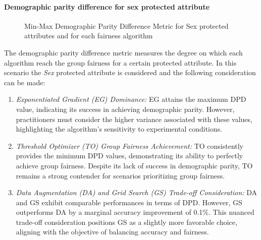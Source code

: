 \paragraph{Demographic parity difference for sex protected attribute}

\begin{figure}[H]
    \centering
    \caption{Min-Max Demographic Parity Difference Metric for Sex protected attributes and for each fairness algorithm}
\end{figure}

The demographic parity difference metric measures the degree on which each algorithm reach the group fairness for a certain protected attribute. In this scenario the \emph{Sex} protected attribute is considered and the following consideration can be made:

\begin{enumerate}
    \item \emph{Exponentiated Gradient (EG) Dominance:} EG attains the maximum DPD value, indicating its success in achieving demographic parity. However, practitioners must consider the higher variance associated with these values, highlighting the algorithm's sensitivity to experimental conditions.

    \item \emph{Threshold Optimizer (TO) Group Fairness Achievement:} TO consistently provides the minimum DPD values, demonstrating its ability to perfectly achieve group fairness. Despite its lack of success in demographic parity, TO remains a strong contender for scenarios prioritizing group fairness.

    \item \emph{Data Augmentation (DA) and Grid Search (GS) Trade-off Consideration:} DA and GS exhibit comparable performances in terms of DPD. However, GS outperforms DA by a marginal accuracy improvement of 0.1\%. This nuanced trade-off consideration positions GS as a slightly more favorable choice, aligning with the objective of balancing accuracy and fairness.
\end{enumerate}

